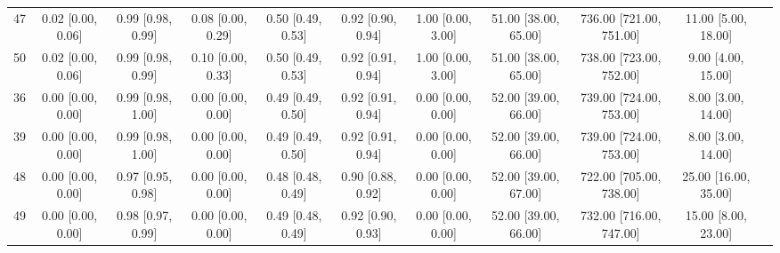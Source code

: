 \documentclass[8pt]{article}
\begin{document}
\begin{center}
\begin{footnotesize}
\begin{longtable}{|ccccccccccc|}
 47 &  0.02 [0.00, 0.06] &  0.99 [0.98, 0.99] &  0.08 [0.00, 0.29] &  0.50 [0.49, 0.53] &  0.92 [0.90, 0.94] &     1.00 [0.00, 3.00] &  51.00 [38.00, 65.00] &  736.00 [721.00, 751.00] &      11.00 [5.00, 18.00] \\
 50 &  0.02 [0.00, 0.06] &  0.99 [0.98, 0.99] &  0.10 [0.00, 0.33] &  0.50 [0.49, 0.53] &  0.92 [0.91, 0.94] &     1.00 [0.00, 3.00] &  51.00 [38.00, 65.00] &  738.00 [723.00, 752.00] &       9.00 [4.00, 15.00] \\
 36 &  0.00 [0.00, 0.00] &  0.99 [0.98, 1.00] &  0.00 [0.00, 0.00] &  0.49 [0.49, 0.50] &  0.92 [0.91, 0.94] &     0.00 [0.00, 0.00] &  52.00 [39.00, 66.00] &  739.00 [724.00, 753.00] &       8.00 [3.00, 14.00] \\
 39 &  0.00 [0.00, 0.00] &  0.99 [0.98, 1.00] &  0.00 [0.00, 0.00] &  0.49 [0.49, 0.50] &  0.92 [0.91, 0.94] &     0.00 [0.00, 0.00] &  52.00 [39.00, 66.00] &  739.00 [724.00, 753.00] &       8.00 [3.00, 14.00] \\
 48 &  0.00 [0.00, 0.00] &  0.97 [0.95, 0.98] &  0.00 [0.00, 0.00] &  0.48 [0.48, 0.49] &  0.90 [0.88, 0.92] &     0.00 [0.00, 0.00] &  52.00 [39.00, 67.00] &  722.00 [705.00, 738.00] &     25.00 [16.00, 35.00] \\
 49 &  0.00 [0.00, 0.00] &  0.98 [0.97, 0.99] &  0.00 [0.00, 0.00] &  0.49 [0.48, 0.49] &  0.92 [0.90, 0.93] &     0.00 [0.00, 0.00] &  52.00 [39.00, 66.00] &  732.00 [716.00, 747.00] &      15.00 [8.00, 23.00] \\
\end{longtable}
\end{footnotesize}
\end{center}
\end{document}
